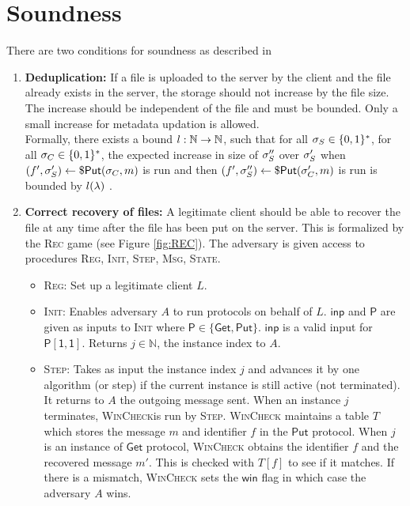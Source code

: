 \section{Soundness}
There are two conditions for soundness as described in \cite{imle}
\begin{enumerate}
	\item \textbf{Deduplication: }If a file is uploaded to the server by the client and the file already exists in the server, the storage should not increase by the file size. The increase should be independent of the file and must be bounded. Only a small increase for metadata updation is allowed.\\ Formally, there exists a bound $l: \mathbb{N} \rightarrow \mathbb{N}$, such that for all $\sigma_S \in \{0,1\}^* $, for all $\sigma_C \in \{0,1\}^*$, the expected increase in size of $\sigma_S ''$ over $\sigma_S '$ when $(f', \sigma_S ') \leftarrow \$ \mathsf{Put}(\sigma_C, m)$ is run and then $(f', \sigma_S '') \leftarrow \$ \mathsf{Put}(\sigma_C ', m)$ is run is bounded by $l(\lambda)$ \cite{imle}.
	\item \textbf{Correct recovery of files: }A legitimate client should be able to recover the file at any time after the file has been put on the server. This is formalized by the \textsc{Rec} game (see Figure \ref{fig:REC}). The adversary is given access to procedures \textsc{Reg, Init, Step, Msg, State}.
	\begin{itemize}
		\item \textsc{Reg: }Set up a legitimate client $L$.
		\item \textsc{Init: }Enables adversary $A$ to run protocols on behalf of $L$. $\mathsf{inp}$ and $\mathsf{P}$ are given as inputs to \textsc{Init} where $\mathsf{P} \in \{ \mathsf{Get}, \mathsf{Put} \}$. $\mathsf{inp}$ is a valid input for $\mathsf{P[1,1]}$. Returns $j \in \mathbb{N}$, the instance index to $A$.
		\item \textsc{Step: } Takes as input the instance index $j$ and advances it by one algorithm (or step) if the current instance is still active (not terminated). It returns to $A$ the outgoing message sent. When an instance $j$ terminates, \textsc{WinCheck}is run by \textsc{Step}. \textsc{WinCheck} maintains a table $T$ which stores the message $m$ and identifier $f$ in the $\mathsf{Put}$ protocol. When $j$ is an instance of $\mathsf{Get}$ protocol, \textsc{WinCheck} obtains the identifier $f$ and the recovered message $m'$. This is checked with $T[f]$ to see if it matches. If there is a mismatch, \textsc{WinCheck} sets the $\mathsf{win}$ flag in which case the adversary $A$ wins.
	\end{itemize}
\end{enumerate}

